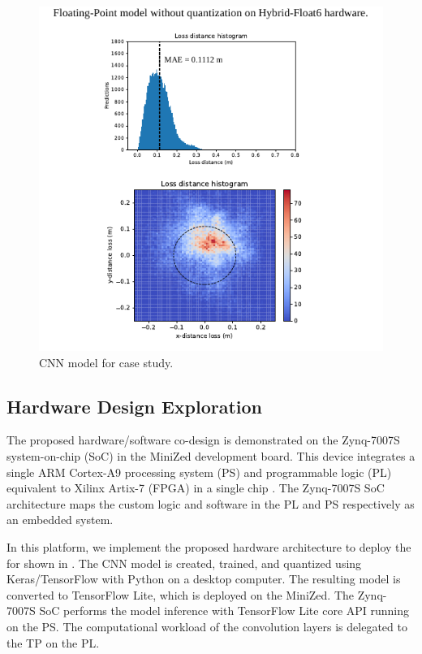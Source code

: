 \begin{figure}[t!]
	\centering
	\includegraphics[width=\columnwidth]{../figures/histograms/model_evaluation_wo_quant.pdf}
	\caption{CNN model for case study.}
	\label{fig:model_evaluation_wo_quant}
\end{figure}

\subsection{Hardware Design Exploration}
The proposed hardware/software co-design is demonstrated on the Zynq-7007S system-on-chip (SoC) in the MiniZed development board. This device integrates a single ARM Cortex-A9 processing system (PS) and programmable logic (PL) equivalent to Xilinx Artix-7 (FPGA) in a single chip \cite{xilinx2015zynq}. The Zynq-7007S SoC architecture maps the custom logic and software in the PL and PS respectively as an embedded system.

In this platform, we implement the proposed hardware architecture to deploy the  for  shown in . The CNN model is created, trained, and quantized using Keras/TensorFlow with Python on a desktop computer. The resulting model is converted to TensorFlow Lite, which is deployed on the MiniZed. The Zynq-7007S SoC performs the model inference with TensorFlow Lite core API running on the PS. The computational workload of the convolution layers is delegated to the TP on the PL.

